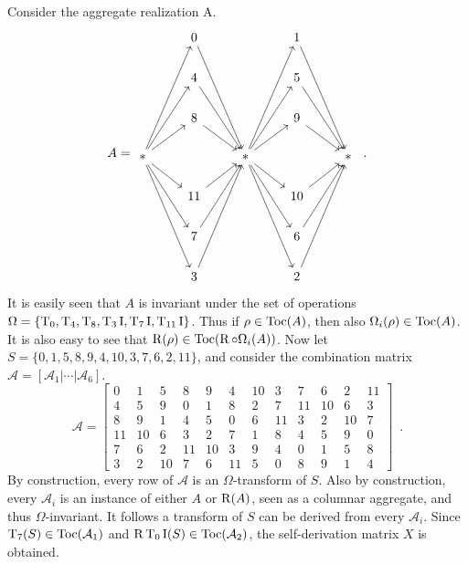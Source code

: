 \begin{example}
    \label{ex:stingray}
    Consider the aggregate realization A.
    \begin{equation}
        A = \begin{tikzcd}
            & 0 \arrow[dddr] && 1 \arrow[dddr] & \\
            & 4 \arrow[ddr] && 5 \arrow[ddr] & \\
            & 8 \arrow[dr] && 9 \arrow[dr] & \\
            * \arrow[ur] \arrow[uur] \arrow[uuur] \arrow[dr] \arrow[ddr] \arrow[dddr] && * \arrow[ur] \arrow[uur] \arrow[uuur] \arrow[dr] \arrow[ddr] \arrow[dddr] && * \\
            & 11 \arrow[ur] && 10 \arrow[ur] & \\
            & 7 \arrow[uur] && 6 \arrow[uur] & \\
            & 3 \arrow[uuur] && 2 \arrow[uuur] &
        \end{tikzcd} \enspace.
    \end{equation}
    It is easily seen that $A$ is invariant under the set of operations $\Omega = \{ \operatorname{T}_0, \operatorname{T}_4, \operatorname{T}_8, \operatorname{T}_3\operatorname{I}, \operatorname{T}_7\operatorname{I}, \operatorname{T}_{11}\operatorname{I} \}$. Thus if $\rho \in \operatorname{Toc}(A)$, then also $\Omega_i(\rho) \in \operatorname{Toc}(A)$. It is also easy to see that $\operatorname{R}(\rho) \in \operatorname{Toc}(\operatorname{R} \circ \Omega_i(A))$. Now let $S = \{ 0, 1, 5, 8, 9, 4, 10, 3, 7, 6, 2, 11 \}$, and consider the combination matrix $\mathcal{A} = [\mathcal{A}_1 | \cdots | \mathcal{A}_6]$.
    \begin{equation}
        \mathcal{A} = \left[
        \begin{array}{cc|cc|cc|cc|cc|cc}
            0 & 1 & 5 & 8 & 9 & 4 & 10 & 3 & 7 & 6 & 2 & 11 \\
            4 & 5 & 9 & 0 & 1 & 8 & 2 & 7 & 11 & 10 & 6 & 3 \\
            8 & 9 & 1 & 4 & 5 & 0 & 6 & 11 & 3 & 2 & 10 & 7 \\
            11 & 10 & 6 & 3 & 2 & 7 & 1 & 8 & 4 & 5 & 9 & 0 \\
            7 & 6 & 2 & 11 & 10 & 3 & 9 & 4 & 0 & 1 & 5 & 8 \\
            3 & 2 & 10 & 7 & 6 & 11 & 5 & 0 & 8 & 9 & 1 & 4
        \end{array}
        \right] \enspace.
    \end{equation}
    By construction, every row of $\mathcal{A}$ is an $\Omega$-transform of $S$. Also by construction, every $\mathcal{A}_i$ is an instance of either $A$ or $\operatorname{R}(A)$, seen as a columnar aggregate, and thus $\Omega$-invariant. It follows a transform of $S$ can be derived from every $\mathcal{A}_i$. Since $\operatorname{T}_7(S) \in \operatorname{Toc}(\mathcal{A}_1)$ and $\operatorname{R}\operatorname{T}_0\operatorname{I}(S) \in \operatorname{Toc}(\mathcal{A}_2)$, the self-derivation matrix $X$ is obtained.

\end{example}
